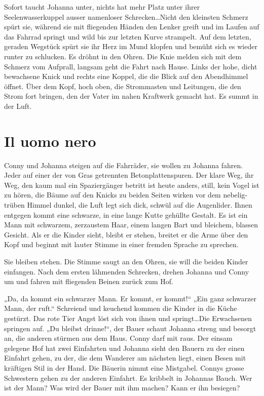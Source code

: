 \documentclass[10pt,titlepage,a5paper]{book}
\begin{document}
Sofort taucht Johanna unter, nichts hat mehr Platz unter ihrer Seelenwasserkuppel ausser namenloser Schrecken\dots Nicht den kleinsten Schmerz spürt sie, während sie mit fliegenden Händen den Lenker greift und im Laufen auf das Fahrrad springt und wild bis zur letzten Kurve strampelt. Auf dem letzten, geraden Wegstück spürt sie ihr Herz im Mund klopfen und bemüht sich es wieder runter zu schlucken. Es dröhnt in den Ohren. Die Knie melden sich mit dem Schmerz vom Aufprall,  langsam geht die Fahrt nach Hause. Links der hohe, dicht bewachsene Knick und rechts eine Koppel, die die Blick auf den Abendhimmel öffnet. Über dem Kopf, hoch oben, die Strommasten und Leitungen, die den Strom fort bringen, den der Vater im nahen Kraftwerk gemacht hat. Es summt in der Luft.



\section*{Il uomo nero}



Conny und Johanna steigen auf die Fahrräder, sie wollen zu Johanna fahren. Jeder auf einer der von Gras getrennten Betonplattenspuren. Der klare Weg, ihr Weg, den kaum mal ein Spaziergänger betritt ist heute anders, still, kein Vogel ist zu hören, die Bäume auf den Knicks zu beiden Seiten wirken vor dem nebelig-trüben Himmel dunkel, die Luft legt sich dick, schwül auf die Augenlider.
 Ihnen entgegen kommt eine schwarze, in eine lange Kutte gehüllte Gestalt. Es ist ein Mann mit schwarzem, zerzaustem  Haar, einem langen Bart und bleichem, blassen Gesicht. Als er die Kinder sieht, bleibt er stehen, breitet er die Arme über den Kopf und beginnt mit lauter Stimme in einer fremden Sprache zu sprechen.
 
Sie bleiben stehen. Die Stimme saugt an den Ohren, sie will die beiden Kinder einfangen. Nach dem ersten lähmenden Schrecken, drehen Johanna und Conny um und fahren mit fliegenden Beinen zurück zum Hof.

„Da, da kommt ein schwarzer Mann. Er kommt, er kommt!“ „Ein ganz schwarzer Mann, der ruft.“ Schreiend und keuchend kommen die Kinder in die Küche gestürzt. Das rote Tier Angst löst sich von ihnen und springt\dots Die Erwachsenen springen auf. „Du bleibst drinne!“, der Bauer schaut Johanna streng und besorgt an, die anderen stürmen aus dem Haus. Conny darf mit raus. Der einsam gelegene Hof hat zwei Einfahrten und Johanna sieht den Bauern zu der einen Einfahrt gehen, zu der, die dem Wanderer am nächsten liegt, einen Besen mit kräftigen Stil in der Hand. Die Bäuerin nimmt eine Mistgabel. Connys grosse Schwestern gehen zu der anderen Einfahrt. Es kribbelt in Johannas Bauch. Wer ist der Mann? Was wird der Bauer mit ihm machen? Kann er ihn besiegen?
\end{document}
